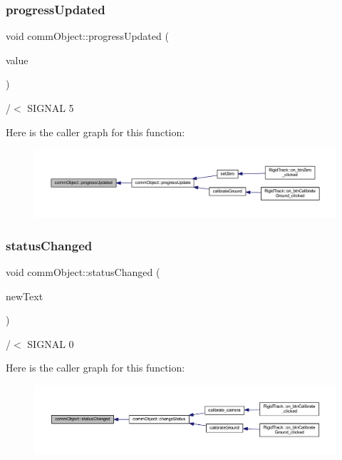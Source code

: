 \subsubsection{\texorpdfstring{progress\+Updated}{progressUpdated}}
{\footnotesize\ttfamily void comm\+Object\+::progress\+Updated (\begin{DoxyParamCaption}\item[{int}]{value }\end{DoxyParamCaption})\hspace{0.3cm}{\ttfamily [signal]}}



/$<$ S\+I\+G\+N\+AL 5 

Here is the caller graph for this function\+:\nopagebreak
\begin{figure}[H]
\begin{center}
\leavevmode
\includegraphics[width=350pt]{classcomm_object_a6039d306f25a6b46c78942edf9cee662_icgraph}
\end{center}
\end{figure}
\mbox{\label{classcomm_object_adccf5b5946d35d5cf6d76f367f93e335}} 
\subsubsection{\texorpdfstring{status\+Changed}{statusChanged}}
{\footnotesize\ttfamily void comm\+Object\+::status\+Changed (\begin{DoxyParamCaption}\item[{Q\+String}]{new\+Text }\end{DoxyParamCaption})\hspace{0.3cm}{\ttfamily [signal]}}



/$<$ S\+I\+G\+N\+AL 0 

Here is the caller graph for this function\+:\nopagebreak
\begin{figure}[H]
\begin{center}
\leavevmode
\includegraphics[width=350pt]{classcomm_object_adccf5b5946d35d5cf6d76f367f93e335_icgraph}
\end{center}
\end{figure}


